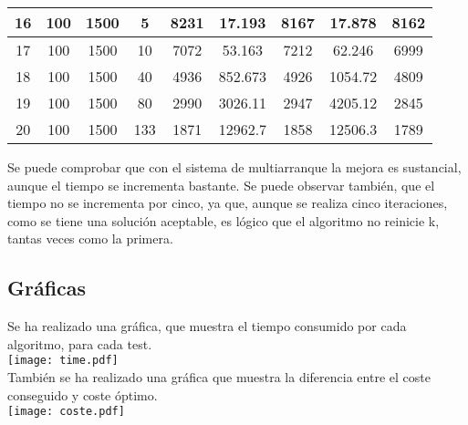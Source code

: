 \begin{center}
\begin{adjustbox}{max width=\textwidth}
\begin{tabular}{|c|c|c|c|c|c|c|c|c|}
		16 & 100 & 1500 & 5   & 8231     & 17.193  & 8167     & 17.878  & 8162      \\ \hline
		17 & 100 & 1500 & 10  & 7072     & 53.163  & 7212     & 62.246  & 6999      \\ \hline
		18 & 100 & 1500 & 40  & 4936     & 852.673 & 4926     & 1054.72 & 4809      \\ \hline
		19 & 100 & 1500 & 80  & 2990     & 3026.11 & 2947     & 4205.12 & 2845      \\ \hline
		20 & 100 & 1500 & 133 & 1871     & 12962.7 & 1858     & 12506.3 & 1789      \\ \hline
	\end{tabular}
\end{adjustbox}
\end{center}

Se puede comprobar que con el sistema de multiarranque la mejora es sustancial, aunque el tiempo se incrementa bastante. Se puede observar también, que el tiempo no se incrementa por cinco, ya que, aunque se realiza cinco iteraciones, como se tiene una solución aceptable, es lógico que el algoritmo no reinicie k, tantas veces como la primera.

\newpage

\subsection{Gráficas}
Se ha realizado una gráfica, que muestra el tiempo consumido por cada algoritmo, para cada test.\\
\texttt{[image: time.pdf]} \\
También se ha realizado una gráfica que muestra la diferencia entre el coste conseguido y coste óptimo.\\
\texttt{[image: coste.pdf]} \\